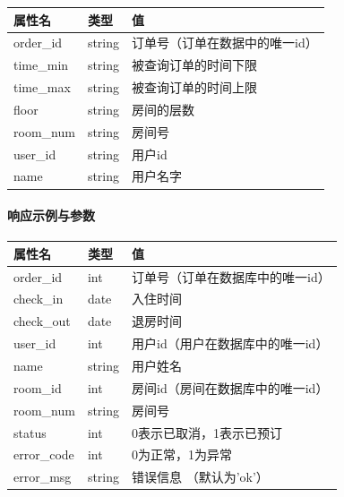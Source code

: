 \documentclass[]{article}
\let\oldparagraph\paragraph
\renewcommand{\paragraph}[1]{\oldparagraph{#1}\mbox{}}
\begin{document}
\begin{longtable}[]{@{}lll@{}}
\toprule
属性名 & 类型 & 值\tabularnewline
\midrule
\endhead
order\_id & string & 订单号（订单在数据中的唯一id）\tabularnewline
time\_min & string & 被查询订单的时间下限\tabularnewline
time\_max & string & 被查询订单的时间上限\tabularnewline
floor & string & 房间的层数\tabularnewline
room\_num & string & 房间号\tabularnewline
user\_id & string & 用户id\tabularnewline
name & string & 用户名字\tabularnewline
\bottomrule
\end{longtable}

\hypertarget{ux54cdux5e94ux793aux4f8bux4e0eux53c2ux6570-12}{%
\paragraph{响应示例与参数}\label{ux54cdux5e94ux793aux4f8bux4e0eux53c2ux6570-12}}

\begin{Shaded}
\begin{Highlighting}[]
\FunctionTok{\{}
    \FunctionTok{:}\OtherTok{[}
        \FunctionTok{\{}
            \FunctionTok{:}\FunctionTok{,}
            \FunctionTok{:}\FunctionTok{,}
            \FunctionTok{:}\FunctionTok{,}
            \FunctionTok{:}\FunctionTok{,}
            \FunctionTok{:}\FunctionTok{,}
            \FunctionTok{:}\FunctionTok{,}
            \FunctionTok{:}\FunctionTok{,}
            \FunctionTok{:}
        \FunctionTok{\}}\OtherTok{,}
        \FunctionTok{\{}
        \FunctionTok{\}}
 
    \OtherTok{]}\FunctionTok{,}
    \FunctionTok{:}\FunctionTok{,}
    \FunctionTok{:}\FunctionTok{,}
\FunctionTok{\}}
\end{Highlighting}
\end{Shaded}

\begin{longtable}[]{@{}lll@{}}
\toprule
属性名 & 类型 & 值\tabularnewline
\midrule
\endhead
order\_id & int & 订单号（订单在数据库中的唯一id）\tabularnewline
check\_in & date & 入住时间\tabularnewline
check\_out & date & 退房时间\tabularnewline
user\_id & int & 用户id（用户在数据库中的唯一id）\tabularnewline
name & string & 用户姓名\tabularnewline
room\_id & int & 房间id（房间在数据库中的唯一id）\tabularnewline
room\_num & string & 房间号\tabularnewline
status & int & 0表示已取消，1表示已预订\tabularnewline
error\_code & int & 0为正常，1为异常\tabularnewline
error\_msg & string & 错误信息 （默认为'ok'）\tabularnewline
\bottomrule
\end{longtable}
\end{document}
